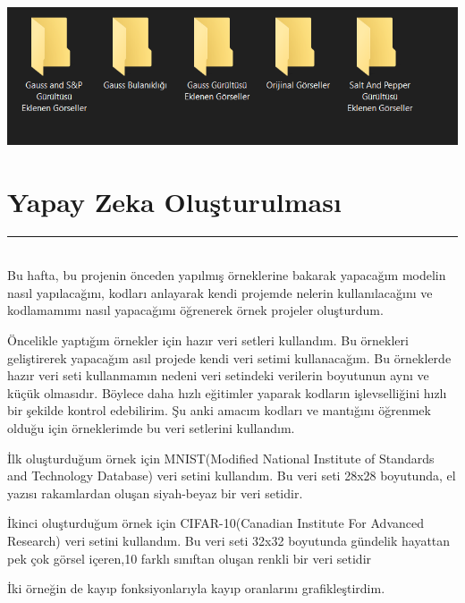 \documentclass{article}
\begin{document}
\includegraphics[width=1\textwidth]{Sınıflandırma.png}\vspace{0,5cm}

\newpage
\section{Yapay Zeka Oluşturulması}
\rule{\textwidth}{0.5pt}\\[10pt]

\noindent Bu hafta, bu projenin önceden yapılmış örneklerine\cite{Github3} bakarak yapacağım modelin nasıl yapılacağını, kodları anlayarak kendi projemde nelerin kullanılacağını ve kodlamamımı nasıl yapacağımı öğrenerek örnek projeler oluşturdum.\vspace{0.5cm}

\noindent Öncelikle yaptığım örnekler için hazır veri setleri kullandım. Bu örnekleri geliştirerek yapacağım asıl projede kendi veri setimi kullanacağım. Bu örneklerde hazır veri seti kullanmamın nedeni veri setindeki verilerin boyutunun aynı ve küçük olmasıdır. Böylece daha hızlı eğitimler yaparak kodların işlevselliğini hızlı bir şekilde kontrol edebilirim. Şu anki amacım kodları ve mantığını öğrenmek olduğu için örneklerimde bu veri setlerini kullandım.\vspace{0.5cm}

\noindent İlk oluşturduğum örnek için MNIST(Modified National Institute of Standards and Technology Database) veri setini kullandım. Bu veri seti 28x28 boyutunda, el yazısı rakamlardan oluşan siyah-beyaz bir veri setidir.\vspace{0.5cm}

\noindent İkinci oluşturduğum örnek için CIFAR-10(Canadian Institute For Advanced Research) veri setini kullandım. Bu veri seti 32x32 boyutunda gündelik hayattan pek çok görsel içeren,10 farklı sınıftan oluşan renkli bir veri setidir\vspace{0.5cm}

\noindent İki örneğin de kayıp fonksiyonlarıyla kayıp oranlarını grafikleştirdim. \vspace{0.5cm}
\end{document}
